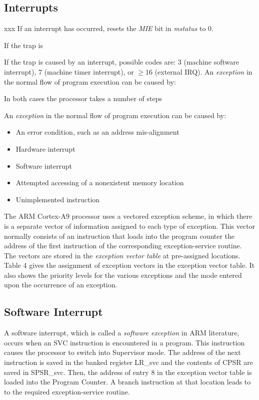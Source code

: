 \documentclass[11pt, twoside, pdftex]{article}
\begin{document}
\subsection{Interrupts}
xxx  If an interrupt has occurred, resets the {\it MIE} bit in {\it mstatus} to 0.

If the trap is

If the trap is caused by an interrupt, possible codes are: 3 (machine software interrupt),
7 (machine timer interrupt), or $\ge 16$ (external IRQ).
An {\it exception} in the normal flow of program execution can be caused by:

In both cases the processor takes a number of steps

An {\it exception} in the normal flow of program execution can be caused by:
\begin{itemize}
\item An error condition, such as an address mis-alignment
\item Hardware interrupt
\item Software interrupt
\item Attempted accessing of a nonexistent memory location
\item Unimplemented instruction
\end{itemize}
\noindent
The ARM Cortex-A9 processor uses a vectored exception scheme, in
which there is a separate vector of information assigned to each
type of exception. This vector normally consists of an instruction
that loads into the program counter the address of the first
instruction of the corresponding exception-service routine. 
The vectors are stored 
in the {\it exception vector table} at pre-assigned locations.
Table 4 gives the assignment of exception vectors in the
exception vector table. It also shows the priority levels
for the various exceptions and the mode entered upon the
occurrence of an exception.

\subsection{Software Interrupt}
\label{sec:swi}

A software interrupt, which is called a {\it software exception}
in ARM literature, occurs when an SVC instruction is
encountered in a program. This instruction causes the processor
to switch into Supervisor mode.
The address of the next instruction is saved in the banked register LR\_svc and the contents of CPSR are saved in SPSR\_svc.
Then, the address of entry 8 in the exception vector table
is loaded into the Program Counter. A branch instruction at that
location leads to to the required exception-service routine.
\end{document}
